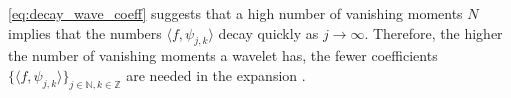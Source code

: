 \eqref{eq:decay_wave_coeff} suggests that a high number of vanishing moments $N$ implies that the numbers $\langle f, \psi_{j,k} \rangle$ decay quickly as $j \to \infty$. Therefore, the higher the number of vanishing moments a wavelet has, the fewer coefficients $\{ \langle f, \psi_{j,k} \rangle \}_{j\in\mathbb{N},k\in\mathbb{Z}}$ are needed in the expansion \cite{page 170, FSE2010}.
